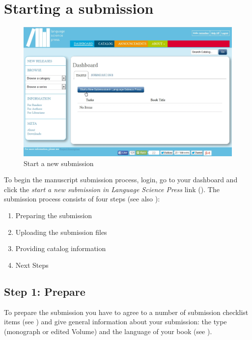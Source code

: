 \section{Starting a submission} \label{sec:submission}
\begin{figure}[h] \centering
\includegraphics[width=1\textwidth]{./img/startSubmission.jpg}
\caption{Start a new submission}
\label{fig:submission}
\end{figure}
To begin the manuscript submission process, login, go to your dashboard and click the \textit{start a new submission in Language Science Press} link (). The submission process consists of four steps (see also  ): 
\begin{enumerate}[noitemsep]
\item Preparing the submission
\item Uploading the submission files
\item Providing catalog information  
\item Next Steps
\end{enumerate}

\subsection*{Step 1: Prepare}

To prepare the submission you have to agree to a number of submission checklist items (see ) and give general information about your submission: the type (monograph or edited Volume) and the language  of your book (see  ).


